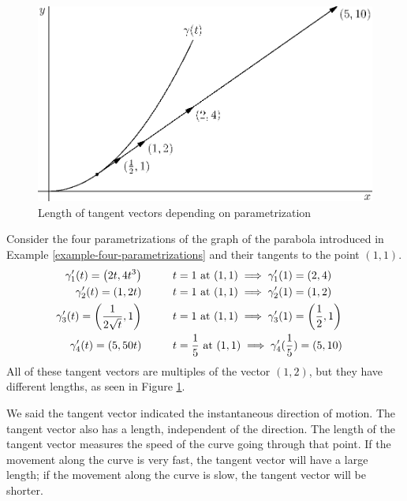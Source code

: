 \documentclass[fleqn,letterpaper]{report}
\begin{document}
\begin{figure}[t]
\centering
\includegraphics[width=12cm]{figure18.eps}
\caption{Length of tangent vectors depending on
parametrization}
\label{figure-tangent-lengths}
\end{figure} 

\begin{example}
Consider the four parametrizations of the graph of the parabola
introduced in Example \ref{example-four-parametrizations}  and their
tangents to the point $(1,1)$.
\begin{align*}
\gamma_1^\prime (t) = \left( 2t, 4t^3 \right) & \hspace{1.0cm} t=1 
\text{ at } (1,1) \implies
\gamma_1^\prime (1) = \left( 2, 4 \right) & \\
\gamma_2^\prime (t) = \left( 1, 2t \right) & \hspace{1.0cm} t=1
\text{ at } (1,1) \implies
\gamma_2^\prime (1) = \left( 1, 2 \right) & \\
\gamma_3^\prime (t) = \left( \frac{1}{2\sqrt{t}}, 1 \right) &
\hspace{1.0cm} t=1 \text{ at } (1,1) \implies
\gamma_3^\prime (1) = \left( \frac{1}{2} , 1 \right) & \\
\gamma_4^\prime (t) = \left( 5, 50t \right) & \hspace{1.0cm} t
= \frac{1}{5} \text{ at } (1,1) \implies
\gamma_4^\prime (\frac{1}{5}) = \left( 5, 10 \right) &\\
\end{align*}
All of these tangent vectors are multiples of the vector
$(1,2)$, but they have different lengths, as seen in Figure
\ref{figure-tangent-lengths}.
\end{example}

We said the tangent vector indicated the instantaneous
direction of motion. The tangent vector also has a length,
independent of the direction. The length of the tangent vector
measures the speed of the curve going through that point. If
the movement along the curve is very fast, the tangent vector
will have a large length; if the movement along the curve is
slow, the tangent vector will be shorter.
\end{document}
